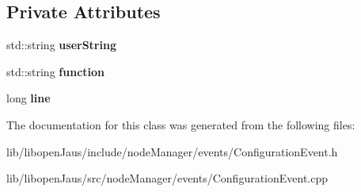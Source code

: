 \subsection*{\-Private \-Attributes}
\begin{DoxyCompactItemize}
\item 
\hypertarget{class_configuration_event_abf982a7b41369e2a4347ddc9aff5312a}{std\-::string {\bfseries user\-String}}\label{class_configuration_event_abf982a7b41369e2a4347ddc9aff5312a}

\item 
\hypertarget{class_configuration_event_ad0a783c63a0bc44e0796075a866c6a71}{std\-::string {\bfseries function}}\label{class_configuration_event_ad0a783c63a0bc44e0796075a866c6a71}

\item 
\hypertarget{class_configuration_event_a94c4e93a02ea2ee5b06a33598acc9f00}{long {\bfseries line}}\label{class_configuration_event_a94c4e93a02ea2ee5b06a33598acc9f00}

\end{DoxyCompactItemize}


\-The documentation for this class was generated from the following files\-:\begin{DoxyCompactItemize}
\item 
lib/libopen\-Jaus/include/node\-Manager/events/\-Configuration\-Event.\-h\item 
lib/libopen\-Jaus/src/node\-Manager/events/\-Configuration\-Event.\-cpp\end{DoxyCompactItemize}
